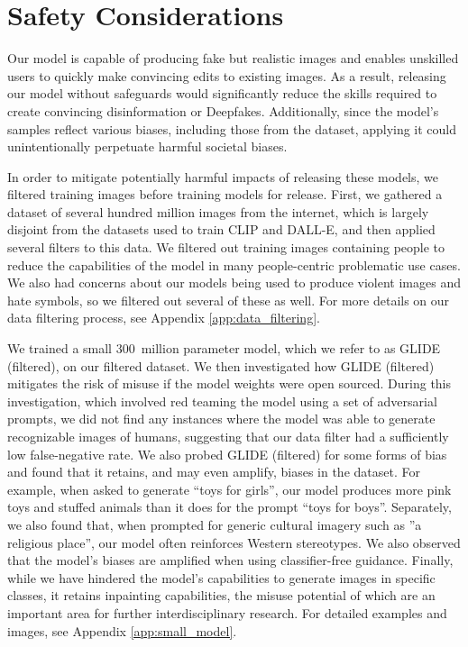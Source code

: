 \documentclass{article}
\newcommand{\modelname}{GLIDE}
\begin{document}
\section{Safety Considerations}
\label{safety_considerations}

Our model is capable of producing fake but realistic images and enables unskilled users to quickly make convincing edits to existing images. As a result, releasing our model without safeguards would significantly reduce the skills required to create convincing disinformation or Deepfakes. Additionally, since the model's samples reflect various biases, including those from the dataset, applying it could unintentionally perpetuate harmful societal biases.

In order to mitigate potentially harmful impacts of releasing these models, we filtered training images before training models for release. First, we gathered a dataset of several hundred million images from the internet, which is largely disjoint from the datasets used to train CLIP and DALL-E, and then applied several filters to this data. We filtered out training images containing people to reduce the capabilities of the model in many people-centric problematic use cases. We also had concerns about our models being used to produce violent images and hate symbols, so we filtered out several of these as well. For more details on our data filtering process, see Appendix \ref{app:data_filtering}.

We trained a small 300~million parameter model, which we refer to as \modelname{} (filtered), on our filtered dataset. We then investigated how \modelname{} (filtered) mitigates the risk of misuse if the model weights were open sourced. During this investigation, which involved red teaming the model using a set of adversarial prompts, we did not find any instances where the model was able to generate recognizable images of humans, suggesting that our data filter had a sufficiently low false-negative rate. 
We also probed \modelname{} (filtered) for some forms of bias and found that it retains, and may even amplify, biases in the dataset. For example, when asked to generate ``toys for girls'', our model produces more pink toys and stuffed animals than it does for the prompt ``toys for boys''. Separately, we also found that, when prompted for generic cultural imagery such as ''a religious place'', our model often reinforces Western stereotypes. We also observed that the model's biases are amplified when using classifier-free guidance. Finally, while we have hindered the model's capabilities to generate images in specific classes, it retains inpainting capabilities,  the misuse potential of which are an important area for further interdisciplinary research. For detailed examples and images, see Appendix \ref{app:small_model}.
\end{document}
